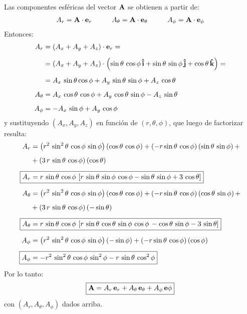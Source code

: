 \documentclass[12pt]{article}
\begin{document}
\begin{enumerate}
Las componentes esféricas del vector $\vb{A}$ se obtienen a partir de:
\begin{align*}
A_{r} = \vb{A} \cdot \vb{e}_{r} \hspace{1cm} A_{\theta} = \vb{A} \cdot \vb{e}_{\theta} \hspace{1cm} A_{\phi} = \vb{A} \cdot \vb{e}_{\phi}
\end{align*}
Entonces:
\begin{align*}
A_{r} &= \left( A_{x} + A_{y} + A_{z} \right) \cdot \vb{e}_{r} = \\[0.5em]
&= \left( A_{x} + A_{y} + A_{z} \right) \cdot \left( \sin \theta \, \cos \phi \,\vu{i} + \sin \theta \, \sin \phi \, \vu{j} + \cos \theta \, \vu{k} \right) = \\[0.5em]
&= A_{x} \, \sin \theta \cos \phi + A_{y} \, \sin \theta \, \sin \phi + A_{z} \, \cos\theta \\[0.5em]
A_{\theta} &= A_{x} \, \cos \theta \, \cos \phi + A_{y} \, \cos \theta \, \sin \phi - A_{z} \, \sin \theta \\[0.5em]
A_{\phi} &= - A_{x} \, \sin \phi + A_{y} \, \cos \phi
\end{align*}
y sustituyendo $\left( A_{x}, A_{y}, A_{z} \right)$ en función de $(r, \theta, \phi)$, que luego de factorizar resulta:
\begin{align*}
A_{r} &= \left( r^{2} \, \sin^2 \theta \, \cos \phi \, \sin \phi \right) \left( \cos \theta \, \cos \phi \right) + \left( - r \sin \theta \, \cos \phi \right) \left( \sin \theta \, \sin \phi \right) + \\[0.5em]
&+ \left( 3 \, r \, \sin \theta \, \cos\phi \right) \left( \cos\theta \right) \\[0.5em]
\Aboxed{A_{r} &= r \, \sin \theta \, \cos \phi \, \left[ r \, \sin \theta \, \sin \phi \, \cos \phi - \sin \theta \, \sin \phi + 3 \, \cos \theta \right]} \\[0.5em]
A_{\theta} &= \left( r^{2} \, \sin^2 \theta \, \cos \phi \, \sin \phi \right) \left( \cos \theta \, \cos \phi \right) + \left( - r \sin \theta \, \cos \phi  \right) \left( \cos \theta \, \sin \phi \right) + \\[0.5em]
&+ \left( 3 \, r \, \sin \theta \, \cos\phi \right) \left( - \sin \theta \right) \\[0.5em]
\Aboxed{A_{\theta} &= r \, \sin \theta \, \cos \phi \, \left[ r \, \sin \theta \, \cos \theta \, \sin \phi \, \cos \phi \, - \cos \theta \, \sin \phi - 3 \, \sin \theta \right]} \\[0.5em]
A_{\phi }&= \left( r^{2} \, \sin^2 \theta \, \cos \phi \, \sin \phi \right) \left( - \sin \phi \right) + \left( - r \sin \theta \, \cos \phi  \right) \left( \cos \phi \right) \\[0.5em]
\Aboxed{A_{\phi}&= - r^{2} \, \sin^{2} \theta \, \cos \phi \, \sin^{2} \phi - r \, \sin \theta \, \cos^{2} \phi}
\end{align*}
Por lo tanto:
\begin{align*}
\boxed{
\vb{A} = A_{r} \,\vb{e}_{r} + A_{\theta} \, \vb{e}_{\theta} + A_{\phi} \, \vb{e}{\phi} }
\end{align*}
con $ (A_{r}, A_{\theta}, A_{\phi} )$ dados arriba.

\end{enumerate}
\end{document}
